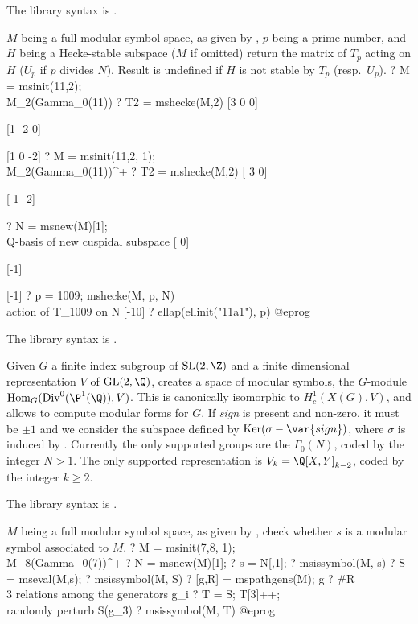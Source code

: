 The library syntax is .

\label{se:mshecke}
$M$ being a full modular symbol space, as given by ,
$p$ being a prime number, and $H$ being a Hecke-stable subspace ($M$ if
omitted) return the matrix of $T_p$ acting on $H$
($U_p$ if $p$ divides $N$). Result is undefined if $H$ is not stable
by $T_p$ (resp.~$U_p$).
\bprog
? M = msinit(11,2); \\ M_2(Gamma_0(11))
? T2 = mshecke(M,2)
[3  0  0]

[1 -2  0]

[1  0 -2]
? M = msinit(11,2, 1); \\ M_2(Gamma_0(11))^+
? T2 = mshecke(M,2)
[ 3  0]

[-1 -2]

? N = msnew(M)[1]; \\ Q-basis of new cuspidal subspace
[ 0]

[-1]

[-1]
? p = 1009; mshecke(M, p, N) \\ action of T_1009 on N
[-10]
? ellap(ellinit("11a1"), p)
@eprog

The library syntax is .

\label{se:msinit}
Given $G$ a finite index subgroup of $\text{SL}(2,\Z)$
and a finite dimensional representation $V$ of $\text{GL}(2,\Q)$, creates a
space of modular symbols, the $G$-module $\text{Hom}_G(\text{Div}^0(\P^1
(\Q)), V)$. This is canonically isomorphic to $H^1_c(X(G), V)$, and allows to
compute modular forms for $G$. If \emph{sign} is present and non-zero, it
must be $\pm1$ and we consider the subspace defined by $\text{Ker} (\sigma -
\var{sign})$, where $\sigma$ is induced by \kbd{[-1,0;0,1]}. Currently the
only supported groups are the $\Gamma_0(N)$, coded by the integer $N > 1$.
The only supported representation is $V_k = \Q[X,Y]_{k-2}$, coded by the
integer $k \geq 2$.

The library syntax is .

\label{se:msissymbol}
$M$ being a full modular symbol space, as given by ,
check whether $s$ is a modular symbol associated to $M$.
\bprog
? M = msinit(7,8, 1); \\ M_8(Gamma_0(7))^+
? N = msnew(M)[1];
? s = N[,1];
? msissymbol(M, s)
? S = mseval(M,s);
? msissymbol(M, S)
? [g,R] = mspathgens(M); g
? #R  \\ 3 relations among the generators g_i
? T = S; T[3]++; \\ randomly perturb S(g_3)
? msissymbol(M, T)
@eprog

